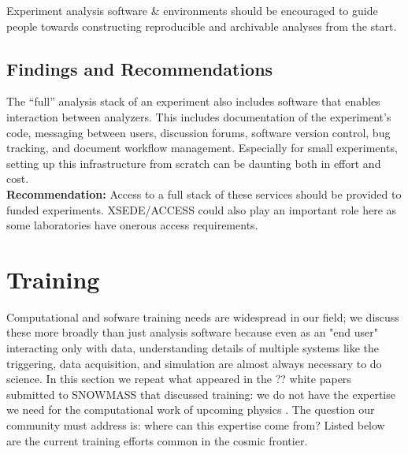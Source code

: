 Experiment analysis software \& environments should be encouraged to guide people towards constructing reproducible and archivable analyses from the start.

\subsection{Findings and Recommendations}
The “full” analysis stack of an experiment also includes software that enables interaction between analyzers. This includes documentation of the experiment's code, messaging between users, discussion forums, software version control, bug tracking, and document workflow management. Especially for small experiments, setting up this infrastructure from scratch can be daunting both in effort and cost.\\
\textbf{Recommendation:} Access to a full stack of these services should be provided to funded experiments.  XSEDE/ACCESS could also play an important role here as some laboratories have onerous access requirements.

\section{Training}\label{sec:training}

Computational and sofware training needs are widespread in our field; we discuss these more broadly than just analysis software because even as an "end user" interacting only with data, understanding details of multiple systems like the triggering, data acquisition, and simulation are almost always necessary to do science.  In this section we repeat what appeared in the ?? white papers submitted to SNOWMASS that discussed training: we do not have the expertise we need for the computational work of upcoming physics \cite{}.  The question our community must address is: where can this expertise come from?  Listed below are the current training efforts common in the cosmic frontier. 


